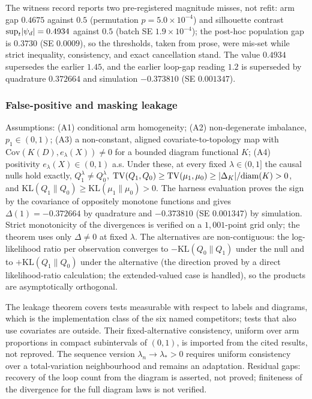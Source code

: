 The witness record reports two pre-registered magnitude misses, not refit: arm gap $0.4675$ against $0.5$ (permutation $p=5.0\times10^{-4}$) and silhouette contrast $\sup_t\lvert \psi_d\rvert=0.4934$ against $0.5$ (batch SE $1.9\times10^{-4}$); the post-hoc population gap is $0.3730$ (SE $0.0009$), so the thresholds, taken from prose, were mis-set while strict inequality, consistency, and exact cancellation stand. The value $0.4934$ supersedes the earlier $1.45$, and the earlier loop-gap reading $1.2$ is superseded by quadrature $0.372664$ and simulation $-0.373810$ (SE $0.001347$).

\subsubsection{False-positive and masking leakage}
\label{app:leakage}

Assumptions: (A1) conditional arm homogeneity; (A2) non-degenerate imbalance, $p_1\in(0,1)$; (A3) a non-constant, aligned covariate-to-topology map with $\mathrm{Cov}(K(D),e_\lambda(X))\ne0$ for a bounded diagram functional $K$; (A4) positivity $e_\lambda(X)\in(0,1)$ a.s. Under these, at every fixed $\lambda\in(0,1]$ the causal nulls hold exactly, $Q_1^\lambda\ne Q_0^\lambda$, $\mathrm{TV}(Q_1,Q_0)\ge\mathrm{TV}(\mu_1,\mu_0)\ge\lvert \Delta_K\rvert/\mathrm{diam}(K)>0$, and $\mathrm{KL}(Q_1\|Q_0)\ge\mathrm{KL}(\mu_1\|\mu_0)>0$. The harness evaluation proves the sign by the covariance of oppositely monotone functions and gives $\Delta(1)=-0.372664$ by quadrature and $-0.373810$ (SE $0.001347$) by simulation. Strict monotonicity of the divergences is verified on a $1{,}001$-point grid only; the theorem uses only $\Delta\ne0$ at fixed $\lambda$. The alternatives are non-contiguous: the log-likelihood ratio per observation converges to $-\mathrm{KL}(Q_0\|Q_1)$ under the null and to $+\mathrm{KL}(Q_1\|Q_0)$ under the alternative (the direction proved by a direct likelihood-ratio calculation; the extended-valued case is handled), so the products are asymptotically orthogonal.

The leakage theorem covers tests measurable with respect to labels and diagrams, which is the implementation class of the six named competitors; tests that also use covariates are outside. Their fixed-alternative consistency, uniform over arm proportions in compact subintervals of $(0,1)$, is imported from the cited results, not reproved. The sequence version $\lambda_n\to\lambda_*>0$ requires uniform consistency over a total-variation neighbourhood and remains an adaptation. Residual gaps: recovery of the loop count from the diagram is asserted, not proved; finiteness of the divergence for the full diagram laws is not verified.

